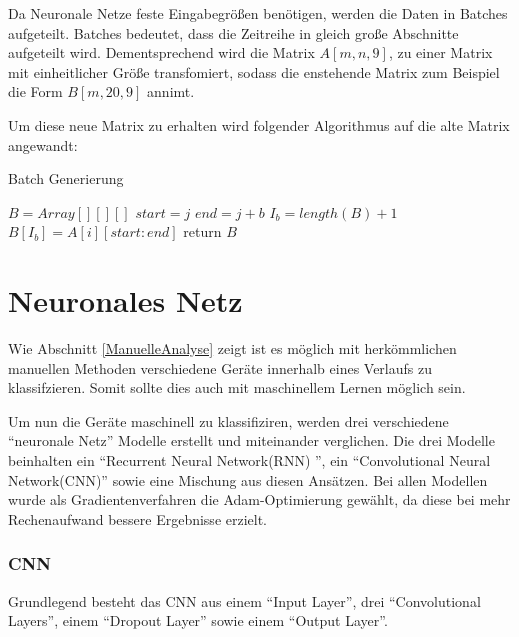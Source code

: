     Da Neuronale Netze feste Eingabegrößen benötigen, werden die Daten in Batches aufgeteilt.
    Batches bedeutet, dass die Zeitreihe in gleich große Abschnitte aufgeteilt wird.
    Dementsprechend wird die Matrix \( A[m, n, 9] \), zu einer Matrix mit einheitlicher Größe transfomiert, sodass die enstehende Matrix zum Beispiel die Form \( B[m, 20, 9] \) annimt.
    \newline

    \noindent
    Um diese neue Matrix zu erhalten wird folgender Algorithmus auf die alte Matrix angewandt:

    \begin{algorithm}\label{alg:BatchGenerierung}
        \caption{Batch Generierung}
        \begin{algorithmic}[1]
        \State{}
            \State ${B} = Array[][][]$
                    \State $start = j$
                    \State $end = j + b$ 
                    \State $I_b = length(B) + 1$
                    \State $B[I_b] = A[i][start : end]$
                \EndFor
            \EndFor
            \State return $B$
        \EndFunction
        \end{algorithmic}
    \end{algorithm}

\section{Neuronales Netz}
    Wie Abschnitt \ref{ManuelleAnalyse} zeigt ist es möglich mit herkömmlichen manuellen Methoden verschiedene Geräte innerhalb eines Verlaufs zu klassifzieren.
    Somit sollte dies auch mit maschinellem Lernen möglich sein.
    \newline

    \noindent
    Um nun die Geräte maschinell zu klassifiziren, werden drei verschiedene "`neuronale Netz"' Modelle erstellt und miteinander verglichen.
    Die drei Modelle beinhalten ein "`Recurrent Neural Network(RNN) "', ein "`Convolutional Neural Network(CNN)"' sowie eine Mischung aus diesen Ansätzen. 
    Bei allen Modellen wurde als Gradientenverfahren die Adam-Optimierung gewählt, da diese bei mehr Rechenaufwand bessere Ergebnisse erzielt.    

    \subsubsection{CNN}
    Grundlegend besteht das \ac{CNN} aus einem "`Input Layer"', drei "`Convolutional Layers"', einem "`Dropout Layer"' sowie einem "`Output Layer"'.
    \newline

